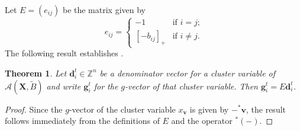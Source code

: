 \documentclass[12pt]{amsart}
\newtheorem{theorem}{Theorem}
\newcommand{\bfd}{\mathbf{d}}
\newcommand{\bfg}{\mathbf{g}}
\newcommand{\bfv}{\mathbf{v}}
\newcommand{\bfX}{\mathbf{X}}
\newcommand{\cA}{\mathcal{A}}
\newcommand{\ZZ}{\mathbb{Z}}
\begin{document}
  Let $E=(e_{ij})$ be the matrix given by
  \[e_{ij}=\begin{cases} -1 & \text{if $i=j$;}\\ [-b_{ij}]_+ & \text{if $i\ne j$.}\end{cases}\]
  The following result establishes \cite[Conj. 3.21]{reading-speyer}.
  \begin{theorem}
    \label{th:d to g}
    Let $\bfd_i^t\in\ZZ^n$ be a denominator vector for a cluster variable of $\cA(\bfX,\tilde B)$ and write $\bfg_i^t$ for the $g$-vector of that cluster variable.  Then $\bfg_i^t=E\bfd_i^t$.
  \end{theorem}
  \begin{proof}
    Since the $g$-vector of the cluster variable $x_\bfv$ is given by $-{}^*\bfv$, the result follows immediately from the definitions of $E$ and the operator ${}^*(-)$.
  \end{proof}
\end{document}
